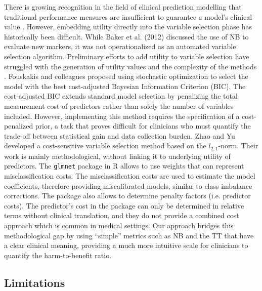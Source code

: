 There is growing recognition in the field of clinical prediction modelling that traditional performance measures are insufficient to guarantee a model's clinical value \cite{steyerberg2019clinical,vancalsterPerformanceEvaluationPredictive2024}. However, embedding utility directly into the variable selection phase has historically been difficult. While Baker et al. (2012) \cite{bakerEvaluatingNewMarker2012} discussed the use of \gls{NB} to evaluate new markers, it was not operationalized as an automated variable selection algorithm. Preliminary efforts to add utility to variable selection have struggled with the generation of utility values and the complexity of the methods \cite{fouskakisBayesianVariableSelection2009}. Fouskakis and colleagues proposed using stochastic optimization to select the model with the best cost-adjusted Bayesian Information Criterion (BIC). The cost-adjusted BIC extends standard model selection by penalizing the total measurement cost of predictors rather than solely the number of variables included. However, implementing this method requires the specification of a cost-penalized prior, a task that proves difficult for clinicians who must quantify the trade-off between statistical gain and data collection burden. Zhao and Yu developed a cost-sensitive variable selection method based on the $l_{2,1}$-norm. Their work is mainly methodological, without linking it to underlying utility of predictors. The \texttt{glmnet} package in R allows to use weights that can represent misclassification costs. The misclassification costs are used to estimate the model coefficients, therefore providing miscalibrated models, similar to class imbalance corrections. The package also allows to determine penalty factors (i.e. predictor costs). The predictor's cost in the package can only be determined in relative terms without clinical translation, and they do not provide a combined cost approach which is common in medical settings. Our approach bridges this methodological gap by using \enquote{simple} metrics such as \gls{NB} and the TT that have a clear clinical meaning, providing a much more intuitive scale for clinicians to quantify the harm-to-benefit ratio.

\subsection{Limitations}


